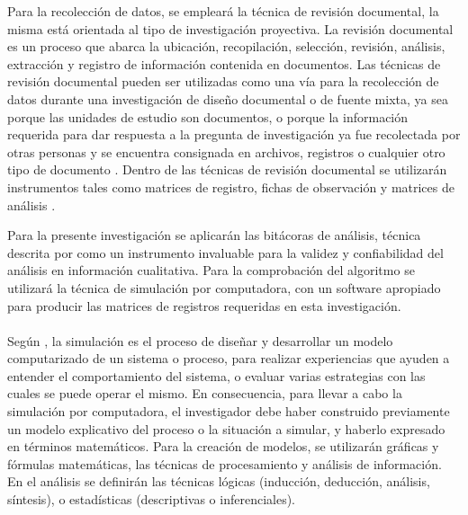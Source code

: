 Para la recolección de datos, se empleará la técnica de revisión documental, la misma está orientada al tipo de investigación proyectiva. La revisión documental es un proceso que abarca la ubicación, recopilación, selección, revisión, análisis, extracción y registro de información contenida en documentos. Las técnicas de revisión documental pueden ser utilizadas como una vía para la recolección de datos durante una investigación de diseño documental o de fuente mixta, ya sea porque las unidades de estudio son documentos, o porque la información requerida para dar respuesta a la pregunta de investigación ya fue recolectada por otras personas y se encuentra consignada en archivos, registros o cualquier otro tipo de documento \cite[p. 851]{hurtado2012metodologia}. Dentro de las técnicas de revisión documental se utilizarán instrumentos tales como matrices de registro, fichas de observación y matrices de análisis \cite[pp. 855-859]{hurtado2012metodologia}.


Para la presente investigación se aplicarán las bitácoras de análisis, técnica descrita por \citet[p.633]{hernandez2010metodologia}  como un instrumento invaluable para la validez y confiabilidad del análisis en información cualitativa. Para la comprobación del algoritmo se utilizará la técnica de simulación por computadora, con un software apropiado para producir las matrices de registros requeridas en esta investigación.\\
\\
Según \citet{hurtado2012metodologia}, la simulación es el proceso de diseñar y desarrollar un modelo computarizado de un sistema o proceso, para realizar experiencias que ayuden a entender el comportamiento del sistema, o evaluar varias estrategias con las cuales se puede operar el mismo. En consecuencia, para llevar a cabo la simulación por computadora, el investigador debe haber construido previamente un modelo explicativo del proceso o la situación a simular, y haberlo expresado en términos matemáticos. Para la creación de modelos, se utilizarán gráficas y fórmulas matemáticas, las técnicas de procesamiento y análisis de información. En el análisis se definirán las técnicas lógicas (inducción, deducción, análisis, síntesis), o estadísticas (descriptivas o inferenciales).


